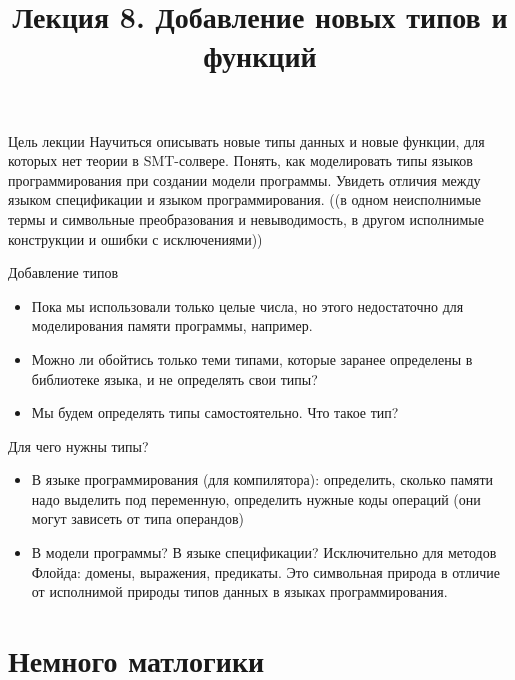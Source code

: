 \documentclass[hyperref={unicode=true}]{beamer}
\title{Лекция 8. Добавление новых типов и функций}
\author{}
\date{}
\begin{document}
	\begin{frame}{}
		\titlepage
	\end{frame}

    \begin{frame}{Цель лекции}
    Научиться описывать новые типы данных и
    новые функции, для которых нет теории в SMT-солвере.
    Понять, как моделировать типы языков
    программирования при создании модели программы.
    Увидеть отличия между языком спецификации и
    языком программирования. ((в одном неисполнимые термы и
                символьные преобразования и невыводимость,
                в другом исполнимые конструкции и ошибки с исключениями))
    \end{frame}



    \begin{frame}{Добавление типов}
    \begin{itemize}
    \item
    Пока мы использовали только целые числа, но этого
    недостаточно для моделирования памяти программы, например.
    \item
    Можно ли обойтись только теми типами, которые заранее
    определены в библиотеке языка, и не определять свои типы?
    \item
    Мы будем определять типы самостоятельно. Что такое тип?
    \end{itemize}
    \end{frame}

    \begin{frame}{Для чего нужны типы?}
    \begin{itemize}
    \item
    В языке программирования (для компилятора):
    определить, сколько памяти надо выделить под переменную,
    определить нужные коды операций (они могут зависеть
            от типа операндов)
    \item
    В модели программы?
    В языке спецификации?
    Исключительно для методов Флойда: домены, выражения,
    предикаты. Это символьная природа в отличие от
    исполнимой природы типов данных в языках программирования.
    \end{itemize}
    \end{frame}

    \section{Немного матлогики}
\end{document}
